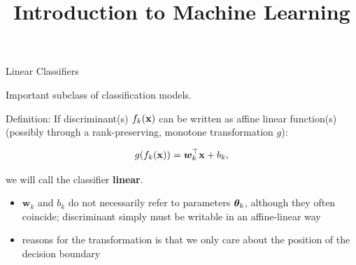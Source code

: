 \documentclass[11pt,compress,t,notes=noshow, xcolor=table]{beamer}
\title{Introduction to Machine Learning}
\begin{document}

\framebreak


\begin{vbframe}{Linear Classifiers}

Important subclass of classification models. 

\lz

Definition: 
If discriminant(s) $f_{k}(\mathbf{x})$ can be written as affine linear function(s)
(possibly through a rank-preserving, monotone transformation $g$):

$$
  g(f_{k}(\mathbf{x})) = \bm{w}_k^\top \mathbf{x} + b_k,
$$

we will call the classifier \textbf{linear}. 

\vfill

\begin{itemize}
\item $\bm{w}_k$ and $b_k$ do not necessarily refer to parameters $\bm{\theta}_k$, although they often coincide; discriminant simply must be writable in an affine-linear way 
\item reasons for the transformation is that we only care about the position of the decision boundary
\end{itemize}


\end{vbframe}
\end{document}
